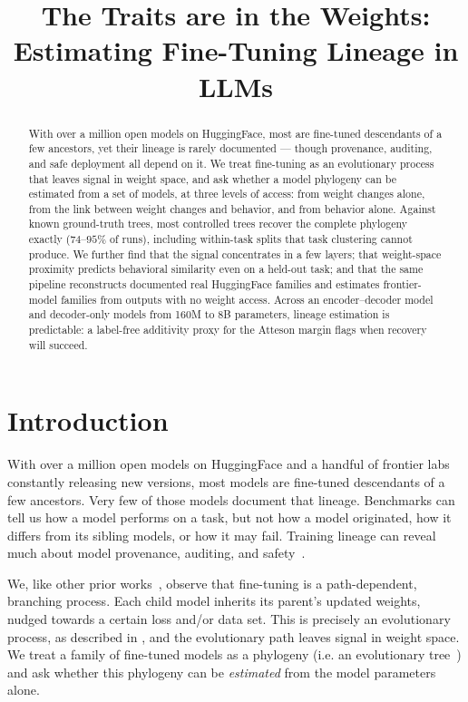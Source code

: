 \documentclass{article}
\title{The Traits are in the Weights: Estimating Fine-Tuning Lineage in LLMs}
\theoremstyle{definition}
\theoremstyle{plain}
\begin{document}
\maketitle

\begin{abstract}
With over a million open models on HuggingFace, most are fine-tuned descendants of a few ancestors, yet their lineage is rarely documented --- though provenance, auditing, and safe deployment all depend on it. We treat fine-tuning as an evolutionary process that leaves signal in weight space, and ask whether a model phylogeny can be estimated from a set of models, at three levels of access: from weight changes alone, from the link between weight changes and behavior, and from behavior alone. Against known ground-truth trees, most controlled trees recover the complete phylogeny exactly ($74$--$95\%$ of runs), including within-task splits that task clustering cannot produce. We further find that the signal concentrates in a few layers; that weight-space proximity predicts behavioral similarity even on a held-out task; and that the same pipeline reconstructs documented real HuggingFace families and estimates frontier-model families from outputs with no weight access. Across an encoder--decoder model and decoder-only models from 160M to 8B parameters, lineage estimation is predictable: a label-free additivity proxy for the Atteson margin flags when recovery will succeed.

\end{abstract}

\section{Introduction}
\label{sec:intro}




With over a million open models on HuggingFace and a handful of frontier
labs constantly releasing new versions, most models are
fine-tuned descendants of a few ancestors.  Very few of those models document that lineage. Benchmarks can tell us how a model performs on a task, but not how a model originated, how it differs from its sibling models, or how it may
fail. Training lineage can reveal much about model provenance, auditing, and safety~\cite{behavioral2026provenance, nikolic2026model, tensorguard2025}.

We, like other prior works~\citep{horwitz2025mother, yu2025neural, wu2026llmdna}, observe that fine-tuning is a path-dependent, branching process. Each
child model inherits its parent's updated weights, nudged towards a certain loss and/or data set. This is
precisely an evolutionary process, as described in \cite{yax2025phylolm}, and the evolutionary path leaves signal in weight space. We treat a family of fine-tuned models
as a phylogeny (i.e. an evolutionary tree~\cite{saitou1987neighbor}) and ask whether this phylogeny can be \emph{estimated} from the model parameters alone.
\end{document}
